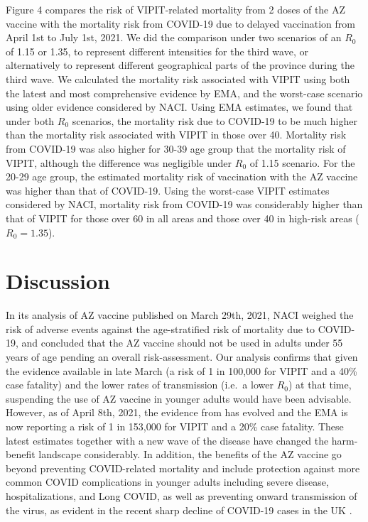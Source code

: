\documentclass[]{interact}
\theoremstyle{plain}%
\theoremstyle{definition}
\theoremstyle{remark}
\begin{document}
Figure 4 compares the risk of VIPIT-related mortality from 2 doses of
the AZ vaccine with the mortality risk from COVID-19 due to delayed
vaccination from April 1st to July 1st, 2021. We did the comparison
under two scenarios of an \(R_0\) of 1.15 or 1.35, to represent
different intensities for the third wave, or alternatively to represent
different geographical parts of the province during the third wave. We
calculated the mortality risk associated with VIPIT using both the
latest and most comprehensive evidence by EMA, and the worst-case
scenario using older evidence considered by NACI. Using EMA estimates,
we found that under both \(R_0\) scenarios, the mortality risk due to
COVID-19 to be much higher than the mortality risk associated with VIPIT
in those over 40. Mortality risk from COVID-19 was also higher for 30-39
age group that the mortality risk of VIPIT, although the difference was
negligible under \(R_0\) of 1.15 scenario. For the 20-29 age group, the
estimated mortality risk of vaccination with the AZ vaccine was higher
than that of COVID-19. Using the worst-case VIPIT estimates considered
by NACI, mortality risk from COVID-19 was considerably higher than that
of VIPIT for those over 60 in all areas and those over 40 in high-risk
areas (\(R_0=1.35\)).

\hypertarget{discussion}{%
\section{Discussion}\label{discussion}}

In its analysis of AZ vaccine published on March 29th, 2021, NACI
weighed the risk of adverse events against the age-stratified risk of
mortality due to COVID-19, and concluded that the AZ vaccine should not
be used in adults under 55 years of age pending an overall
risk-assessment. Our analysis confirms that given the evidence available
in late March (a risk of 1 in 100,000 for VIPIT and a 40\% case
fatality) and the lower rates of transmission (i.e.~a lower \(R_0\)) at
that time, suspending the use of AZ vaccine in younger adults would have
been advisable. However, as of April 8th, 2021, the evidence from has
evolved and the EMA is now reporting a risk of 1 in 153,000 for VIPIT
and a 20\% case fatality. These latest estimates together with a new
wave of the disease have changed the harm-benefit landscape
considerably. In addition, the benefits of the AZ vaccine go beyond
preventing COVID-related mortality and include protection against more
common COVID complications in younger adults including severe disease,
hospitalizations, and Long COVID, as well as preventing onward
transmission of the virus, as evident in the recent sharp decline of
COVID-19 cases in the UK \citep{our_world_in_data_covid-19_2021}.
\end{document}
